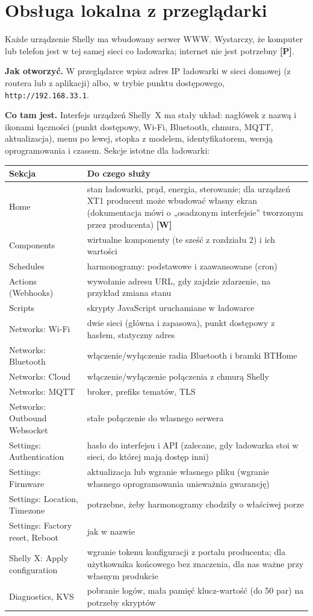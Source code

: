 \documentclass[11pt,a4paper]{article}
\newcommand{\tagP}{\textcolor{apgreen}{\textbf{[P]}}}
\newcommand{\tagW}{\textcolor{apamber}{\textbf{[W]}}}
\newcommand{\code}[1]{\texttt{#1}}
\begin{document}
\section{Obsługa lokalna z przeglądarki}

Każde urządzenie Shelly ma wbudowany serwer WWW. Wystarczy, że komputer lub telefon jest w tej samej sieci co ładowarka; internet nie jest potrzebny \tagP.

\textbf{Jak otworzyć.} W przeglądarce wpisz adres IP ładowarki w sieci domowej (z routera lub z aplikacji) albo, w trybie punktu dostępowego, \code{http://192.168.33.1}.

\textbf{Co tam jest.} Interfejs urządzeń Shelly~X ma stały układ: nagłówek z nazwą i ikonami łączności (punkt dostępowy, Wi-Fi, Bluetooth, chmura, MQTT, aktualizacja), menu po lewej, stopka z modelem, identyfikatorem, wersją oprogramowania i czasem. Sekcje istotne dla ładowarki:

\begin{tabularx}{\textwidth}{p{4.4cm}X}
\toprule
\textbf{Sekcja} & \textbf{Do czego służy} \\
\midrule
Home & stan ładowarki, prąd, energia, sterowanie; dla urządzeń XT1 producent może wbudować własny ekran (dokumentacja mówi o „osadzonym interfejsie” tworzonym przez producenta) \tagW \\
Components & wirtualne komponenty (te sześć z rozdziału 2) i ich wartości \\
Schedules & harmonogramy: podstawowe i zaawansowane (cron) \\
Actions (Webhooks) & wywołanie adresu URL, gdy zajdzie zdarzenie, na przykład zmiana stanu \\
Scripts & skrypty JavaScript uruchamiane w ładowarce \\
Networks: Wi-Fi & dwie sieci (główna i zapasowa), punkt dostępowy z hasłem, statyczny adres \\
Networks: Bluetooth & włączenie/wyłączenie radia Bluetooth i bramki BTHome \\
Networks: Cloud & włączenie/wyłączenie połączenia z chmurą Shelly \\
Networks: MQTT & broker, prefiks tematów, TLS \\
Networks: Outbound Websocket & stałe połączenie do własnego serwera \\
Settings: Authentication & hasło do interfejsu i API (zalecane, gdy ładowarka stoi w sieci, do której mają dostęp inni) \\
Settings: Firmware & aktualizacja lub wgranie własnego pliku (wgranie własnego oprogramowania unieważnia gwarancję) \\
Settings: Location, Timezone & potrzebne, żeby harmonogramy chodziły o właściwej porze \\
Settings: Factory reset, Reboot & jak w nazwie \\
Shelly X: Apply configuration & wgranie tokenu konfiguracji z portalu producenta; dla użytkownika końcowego bez znaczenia, dla nas ważne przy własnym produkcie \\
Diagnostics, KVS & pobranie logów, mała pamięć klucz-wartość (do 50 par) na potrzeby skryptów \\
\bottomrule
\end{tabularx}
\end{document}
